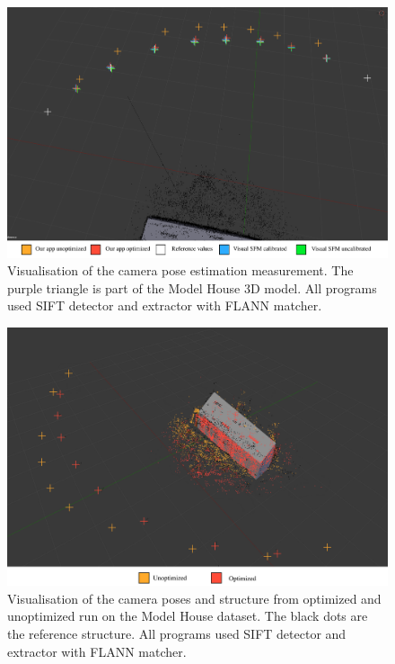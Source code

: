 \begin{figure}[!htbp]
	\begin{center}
		\includegraphics[keepaspectratio,width=13cm]{fig/pose_comparison.pdf}
	\end{center}
	\caption{Visualisation of the camera pose estimation measurement. The purple triangle is part of the Model House 3D model. All programs used SIFT detector and extractor with FLANN matcher.}
	\label{fig:pose_comparison1}
\end{figure} 
\begin{figure}[!htbp]
	\begin{center}
		\includegraphics[keepaspectratio,width=13cm]{fig/pose_comparison2.pdf}
	\end{center}
	\caption{Visualisation of the camera poses and structure from optimized and unoptimized run on the Model House dataset. The black dots are the reference structure. All programs used SIFT detector and extractor with FLANN matcher.}
	\label{fig:pose_comparison2}
\end{figure}
